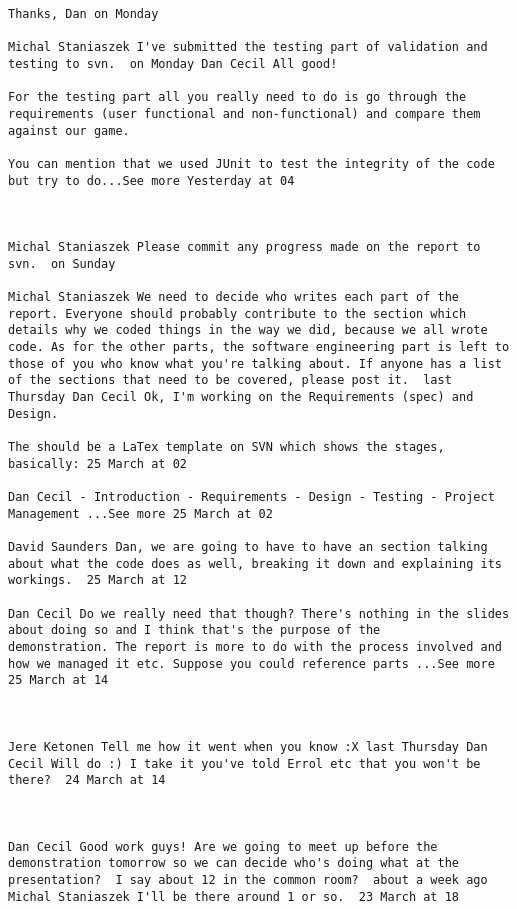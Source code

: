 \begin{verbatim}
Thanks, Dan on Monday

Michal Staniaszek I've submitted the testing part of validation and
testing to svn.  on Monday Dan Cecil All good!

For the testing part all you really need to do is go through the
requirements (user functional and non-functional) and compare them
against our game.

You can mention that we used JUnit to test the integrity of the code
but try to do...See more Yesterday at 04



Michal Staniaszek Please commit any progress made on the report to
svn.  on Sunday

Michal Staniaszek We need to decide who writes each part of the
report. Everyone should probably contribute to the section which
details why we coded things in the way we did, because we all wrote
code. As for the other parts, the software engineering part is left to
those of you who know what you're talking about. If anyone has a list
of the sections that need to be covered, please post it.  last
Thursday Dan Cecil Ok, I'm working on the Requirements (spec) and
Design.

The should be a LaTex template on SVN which shows the stages,
basically: 25 March at 02

Dan Cecil ‎- Introduction - Requirements - Design - Testing - Project
Management ...See more 25 March at 02

David Saunders Dan, we are going to have to have an section talking
about what the code does as well, breaking it down and explaining its
workings.  25 March at 12

Dan Cecil Do we really need that though? There's nothing in the slides
about doing so and I think that's the purpose of the
demonstration. The report is more to do with the process involved and
how we managed it etc. Suppose you could reference parts ...See more
25 March at 14



Jere Ketonen Tell me how it went when you know :X last Thursday Dan
Cecil Will do :) I take it you've told Errol etc that you won't be
there?  24 March at 14



Dan Cecil Good work guys! Are we going to meet up before the
demonstration tomorrow so we can decide who's doing what at the
presentation?  I say about 12 in the common room?  about a week ago
Michal Staniaszek I'll be there around 1 or so.  23 March at 18


\end{verbatim}
